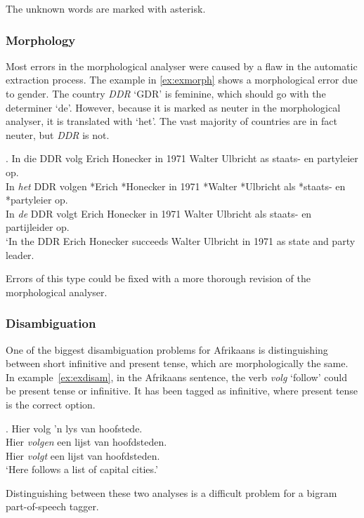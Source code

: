 \documentclass[11pt]{article}
\begin{document}
The unknown words are marked with asterisk.

\subsubsection{Morphology}

Most errors in the morphological analyser were caused by a flaw in the automatic extraction process.
The example in \ref{ex:exmorph} shows a morphological error due to gender. The 
country \emph{DDR} `GDR' is feminine, which should go with the determiner `de'. However, because 
it is marked as neuter in the morphological analyser, it is translated with `het'. The vast 
majority of countries are in fact neuter, but \emph{DDR} is not. 

\ex. \label{ex:exmorph}
    In die DDR volg Erich Honecker in 1971 Walter Ulbricht as staats- en partyleier op. \\
    In {\em het} DDR volgen *Erich *Honecker in 1971 *Walter *Ulbricht als *staats- en *partyleier op. \\
    In {\em de} DDR volgt Erich Honecker in 1971 Walter Ulbricht als staats- en partijleider op. \\
    `In the DDR Erich Honecker succeeds Walter Ulbricht in 1971 as state and party leader.

Errors of this type could be fixed with a more thorough revision of the morphological
analyser.

\subsubsection{Disambiguation}

One of the biggest disambiguation problems for Afrikaans is distinguishing between short infinitive and present 
tense, which are morphologically the same. In example~\ref{ex:exdisam}, in the Afrikaans sentence, the verb 
{\em volg} `follow' could be present tense or infinitive. It has been tagged as infinitive, where present tense 
is the correct option.

\ex. \label{ex:exdisam} 
    Hier volg 'n lys van hoofstede. \\
    Hier {\em volgen} een lijst van hoofdsteden. \\
    Hier {\em volgt} een lijst van hoofdsteden.  \\
   `Here follows a list of capital cities.'

Distinguishing between these two analyses is a difficult problem for a bigram part-of-speech tagger.
\end{document}
